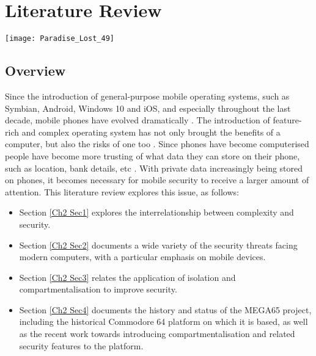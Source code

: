 
\chapter{Literature Review} %

\label{Chapter 2} %

\texttt{[image: Paradise\_Lost\_49]}

\section{Overview}

Since the introduction of general-purpose mobile operating systems, such as Symbian, Android, Windows 10 and iOS, and especially throughout the last decade, mobile phones have evolved dramatically \cite{Reference1}.
The introduction of feature-rich and complex operating system has not only brought the benefits of a computer, but also the risks of one too \cite{Reference2}.
Since phones have become computerised people have become more trusting of what data they can store on their phone, such as location, bank details, etc \cite{Reference3}.
With private data increasingly being stored on phones, it becomes necessary for mobile security to receive a larger amount of attention.
This literature review explores this issue, as follows:
\begin{itemize}
\item{Section \ref{Ch2 Sec1} explores the interrelationship between complexity and security.}
\item{Section \ref{Ch2 Sec2} documents a wide variety of the security threats facing modern computers, with a particular emphasis on mobile devices.}
\item{Section \ref{Ch2 Sec3} relates the application of isolation and compartmentalisation to improve security.}
\item{Section \ref{Ch2 Sec4} documents the history and status of the MEGA65 project, including the historical Commodore 64 platform on which it is based, as well as the recent work towards introducing compartmentalisation and related security features to the platform.}
\end{itemize}


